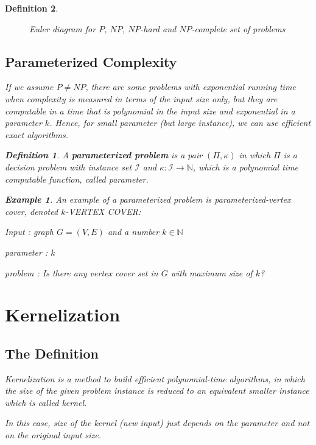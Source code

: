 \documentclass[12pt]{article}
\theoremstyle{slplain}
\newtheorem{defi}{Definition}[section]
\newtheorem{exam}{Example}[section]
\begin{document}
\begin{defi}
\begin{figure}[!ht]
\caption{\tiny Euler diagram for $P$, $NP$, $NP$-hard and $NP$-complete set of problems}\label{fig}
\end{figure}

\newpage
\subsection{Parameterized Complexity}

If we assume $P \not = NP$, there are some problems with exponential running time when complexity is measured in terms of the input size only, but they are computable in a time that is polynomial in the input size and exponential in a parameter $k$. Hence, for small parameter (but large instance), we can use efficient exact algorithms. 

\begin{defi}
A {\bf parameterized problem} is a pair $(\Pi, \kappa)$ in which $\Pi$ is a
decision problem with instance set $\mathcal{I}$ and $\kappa : \mathcal{I} \to \mathbb{N}$, which is a polynomial
time computable function, called parameter.
\end{defi}

\begin{exam}
An example of a parameterized problem is parameterized-vertex cover, denoted $k$-VERTEX COVER:

Input : graph $G = (V, E)$ and a number $k \in \mathbb{N}$

parameter : $k$

problem : Is there any vertex cover set in $G$ with maximum size of $k$?
\end{exam}






\newpage

\section{Kernelization}
\subsection{The Definition}
Kernelization is a method to build efficient polynomial-time algorithms, 
in which the size of the given problem instance is reduced to an equivalent smaller instance which is called kernel. 

In this case, size of the kernel (new input) just depends on the parameter and not on the original input size. 


\end{defi}
\end{document}
